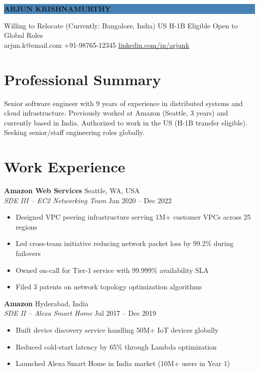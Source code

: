 \documentclass[10pt,letterpaper]{article}
\begin{document}
\noindent\colorbox{steelblue}{\parbox{\dimexpr\linewidth-2\fboxsep}{%
\centering\color{white}\bfseries\large\vspace{4pt}ARJUN KRISHNAMURTHY\vspace{4pt}}}

\vspace{6pt}
\begin{center}
{\small {} Willing to Relocate (Currently: Bangalore, India) \quad {} US H-1B Eligible \quad {} Open to Global Roles}\\[3pt]
{\small {} arjun.k@email.com \quad {} +91-98765-12345 \quad {} \href{https://linkedin.com/in/arjunk}{linkedin.com/in/arjunk}}
\end{center}

\section{Professional Summary}
Senior software engineer with 9 years of experience in distributed systems and cloud infrastructure. Previously worked at Amazon (Seattle, 3 years) and currently based in India. Authorized to work in the US (H-1B transfer eligible). Seeking senior/staff engineering roles globally.

\section{Work Experience}

\textbf{Amazon Web Services} \hfill Seattle, WA, USA\\
\textit{SDE III -- EC2 Networking Team} \hfill Jan 2020 -- Dec 2022
\begin{itemize}
\item Designed VPC peering infrastructure serving 1M+ customer VPCs across 25 regions
\item Led cross-team initiative reducing network packet loss by 99.2\% during failovers
\item Owned on-call for Tier-1 service with 99.999\% availability SLA
\item Filed 3 patents on network topology optimization algorithms
\end{itemize}

\textbf{Amazon} \hfill Hyderabad, India\\
\textit{SDE II -- Alexa Smart Home} \hfill Jul 2017 -- Dec 2019
\begin{itemize}
\item Built device discovery service handling 50M+ IoT devices globally
\item Reduced cold-start latency by 65\% through Lambda optimization
\item Launched Alexa Smart Home in India market (10M+ users in Year 1)
\end{itemize}
\end{document}

